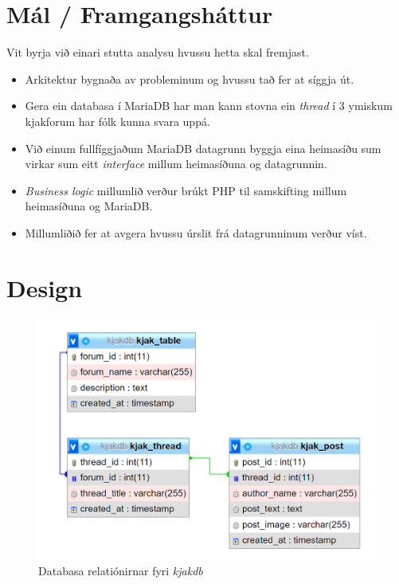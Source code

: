\documentclass{article}
\begin{document}
\section{Mál / Framgangsháttur}
\par Vit byrja við einari stutta analysu hvussu hetta skal fremjast.
\begin{itemize}
    \item Arkitektur bygnaða av probleminum og hvussu tað fer at síggja út.
    \item Gera ein databasa í MariaDB har man kann stovna ein \textit{thread} í 3 ymiskum kjakforum har fólk kunna svara uppá.
    \item Við einum fullfíggjaðum MariaDB datagrunn byggja eina heimasíðu sum virkar sum eitt \textit{interface} millum heimasíðuna og datagrunnin.
    \item \textit{Business logic} millumlið verður brúkt PHP til samskifting millum
            \newline heimasíðuna og MariaDB.
    \item Millumliðið fer at avgera hvussu úrslit frá datagrunninum verður víst.
    
\end{itemize}

\section{Design}
\begin{figure}[H]
    \includegraphics[width=\linewidth]{kjakdb_table_relations.png}
    \caption{Databasa relatiónirnar fyri \textit{kjakdb}}
    \label{fig:kjakdb_table_relations}
\end{figure}
\end{document}
